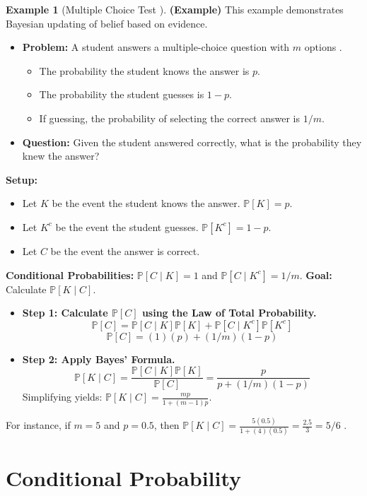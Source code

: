\documentclass[12pt, a4paper]{article}
\theoremstyle{definition}
\newtheorem{example}{Example}[section] %
\theoremstyle{plain}
\newcommand{\Prob}[1]{\mathbb{P}\left[#1\right]} %
\newcommand{\condProb}[2]{\mathbb{P}\left[#1 \mid #2\right]} %
\newcommand{\comp}[1]{#1^c} %
\begin{document}
\begin{example}[Multiple Choice Test \cite{Ross}]
\textbf{(Example)} This example demonstrates Bayesian updating of belief based on evidence.
\begin{itemize}
    \item \textbf{Problem:} A student answers a multiple-choice question with $m$ options \cite{Ross}.
        \begin{itemize}
            \item The probability the student knows the answer is $p$.
            \item The probability the student guesses is $1-p$.
            \item If guessing, the probability of selecting the correct answer is $1/m$.
        \end{itemize}
    \item \textbf{Question:} Given the student answered correctly, what is the probability they knew the answer?
\end{itemize}
\textbf{Setup:}
\begin{itemize}
    \item Let $K$ be the event the student knows the answer. $\Prob{K} = p$.
    \item Let $\comp{K}$ be the event the student guesses. $\Prob{\comp{K}} = 1-p$.
    \item Let $C$ be the event the answer is correct.
\end{itemize}
\textbf{Conditional Probabilities:} $\condProb{C}{K} = 1$ and $\condProb{C}{\comp{K}} = 1/m$.
\textbf{Goal:} Calculate $\condProb{K}{C}$.
\begin{itemize}
    \item \textbf{Step 1: Calculate $\Prob{C}$ using the Law of Total Probability.}
        \[ \Prob{C} = \condProb{C}{K}\Prob{K} + \condProb{C}{\comp{K}}\Prob{\comp{K}} \]
        \[ \Prob{C} = (1)(p) + (1/m)(1-p) \]
    \item \textbf{Step 2: Apply Bayes' Formula.}
        \[ \condProb{K}{C} = \frac{\condProb{C}{K}\Prob{K}}{\Prob{C}} = \frac{p}{p + (1/m)(1-p)} \]
        Simplifying yields: $\condProb{K}{C} = \frac{mp}{1 + (m-1)p}$.
\end{itemize}
For instance, if $m=5$ and $p=0.5$, then $\condProb{K}{C} = \frac{5(0.5)}{1+(4)(0.5)} = \frac{2.5}{3} = 5/6$ \cite{Ross}.
\end{example}

\section{Conditional Probability}
\end{document}
